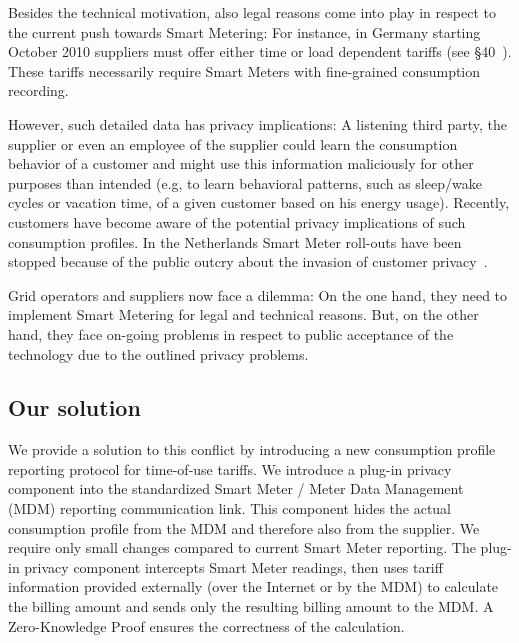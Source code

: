 \documentclass[english]{llncs}
\begin{document}
Besides the technical motivation, also legal reasons come into play in respect to the current push towards Smart Metering: 
For instance, in Germany starting October 2010 suppliers must offer either time or load dependent tariffs (see §40~\cite{engw}).
These tariffs necessarily require Smart Meters with fine-grained consumption recording. 

However, such detailed data has privacy implications: 
A listening third party, the supplier or even an employee of the supplier could learn the consumption behavior of a customer and might use this information maliciously for other purposes than intended (e.g, to learn behavioral patterns, such as sleep/wake cycles or vacation time, of a given customer based on his energy usage).
Recently, customers have become aware of the potential privacy implications of such consumption profiles.
In the Netherlands Smart Meter roll-outs have been stopped because of the public outcry about the invasion of customer privacy~\cite{netherlandsstop}.

Grid operators and suppliers now face a dilemma:
On the one hand, they need to implement Smart Metering for legal and technical reasons.
But, on the other hand, they face on-going problems in respect to public acceptance of the technology due to the outlined privacy problems. 

\subsection{Our solution}

We provide a solution to this conflict by introducing a new consumption profile reporting protocol for time-of-use tariffs. 
We introduce a plug-in privacy component into the standardized Smart Meter / Meter Data Management (MDM) reporting communication link.
This component hides the actual consumption profile from the MDM and therefore also from the supplier.
We require only small changes compared to current Smart Meter reporting.
The plug-in privacy component intercepts Smart Meter readings, then uses tariff information provided externally (over the Internet or by the MDM) to calculate the billing amount and sends only the resulting billing amount to the MDM.
A Zero-Knowledge Proof ensures the correctness of the calculation.
\end{document}
